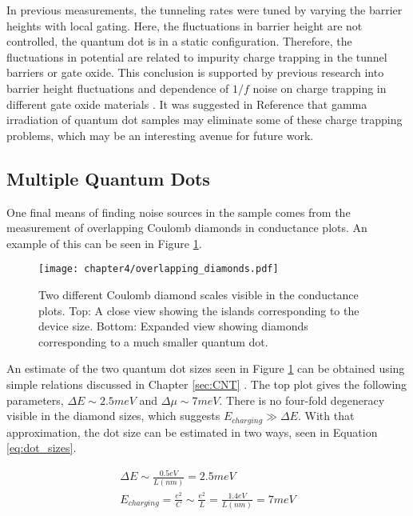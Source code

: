 In previous measurements, the tunneling rates were tuned by varying the barrier heights with local gating. Here, the fluctuations in barrier height are not controlled, the quantum dot is in a static configuration. Therefore, the fluctuations in potential are related to impurity charge trapping in the tunnel barriers or gate oxide. This conclusion is supported by previous research into barrier height fluctuations \cite{Jung2004} and dependence of $1/f$ noise on charge trapping in different gate oxide materials \cite{Sydoruk2014}. It was suggested in Reference \cite{Sydoruk2014} that gamma irradiation of quantum dot samples may eliminate some of these charge trapping problems, which may be an interesting avenue for future work.

\subsection{Multiple Quantum Dots}

One final means of finding noise sources in the sample comes from the measurement of overlapping Coulomb diamonds in conductance plots. An example of this can be seen in Figure \ref{fig:overlapping_diamonds}.

\begin{figure}
    \centering
    \texttt{[image: chapter4/overlapping\_diamonds.pdf]}
    \caption{Two different Coulomb diamond scales visible in the conductance plots. Top: A close view showing the islands corresponding to the device size. Bottom: Expanded view showing diamonds corresponding to a much smaller quantum dot.}
    \label{fig:overlapping_diamonds}
\end{figure}

An estimate of the two quantum dot sizes seen in Figure \ref{fig:overlapping_diamonds} can be obtained using simple relations discussed in Chapter \ref{sec:CNT} \cite{Bockrath1997}. The top plot gives the following parameters, $\Delta E \sim 2.5meV$ and $\Delta \mu \sim 7meV$. There is no four-fold degeneracy visible in the diamond sizes, which suggests $E_{charging} \gg \Delta E$. With that approximation, the dot size can be estimated in two ways, seen in Equation \ref{eq:dot_sizes}.

\begin{align}
    \Delta E \sim \frac{0.5eV}{L(nm)} = 2.5meV \nonumber \\
    E_{charging} = \frac{e^2}{C} \sim \frac{e^2}{L} = \frac{1.4eV}{L(nm)} = 7meV
    \label{eq:dot_sizes}
\end{align}

